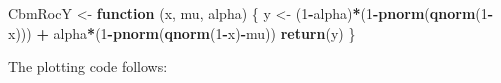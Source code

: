 \documentclass[
]{book}
\newenvironment{Shaded}{\begin{snugshade}}{\end{snugshade}}
\newcommand{\ControlFlowTok}[1]{\textcolor[rgb]{0.13,0.29,0.53}{\textbf{#1}}}
\newcommand{\DecValTok}[1]{\textcolor[rgb]{0.00,0.00,0.81}{#1}}
\newcommand{\KeywordTok}[1]{\textcolor[rgb]{0.13,0.29,0.53}{\textbf{#1}}}
\newcommand{\NormalTok}[1]{#1}
\newcommand{\OperatorTok}[1]{\textcolor[rgb]{0.81,0.36,0.00}{\textbf{#1}}}
\newcommand{\StringTok}[1]{\textcolor[rgb]{0.31,0.60,0.02}{#1}}
\begin{document}
\begin{Shaded}
\begin{Highlighting}[]
\NormalTok{CbmRocY <-}\StringTok{ }\ControlFlowTok{function}\NormalTok{ (x, mu, alpha) \{}
\NormalTok{  y <-}\StringTok{ }\NormalTok{(}\DecValTok{1}\OperatorTok{-}\NormalTok{alpha)}\OperatorTok{*}\NormalTok{(}\DecValTok{1}\OperatorTok{-}\KeywordTok{pnorm}\NormalTok{(}\KeywordTok{qnorm}\NormalTok{(}\DecValTok{1}\OperatorTok{-}\NormalTok{x))) }\OperatorTok{+}\StringTok{ }
\StringTok{    }\NormalTok{alpha}\OperatorTok{*}\NormalTok{(}\DecValTok{1}\OperatorTok{-}\KeywordTok{pnorm}\NormalTok{(}\KeywordTok{qnorm}\NormalTok{(}\DecValTok{1}\OperatorTok{-}\NormalTok{x)}\OperatorTok{-}\NormalTok{mu))}
  \KeywordTok{return}\NormalTok{(y)}
\NormalTok{\}}
\end{Highlighting}
\end{Shaded}

The plotting code follows:
\end{document}
